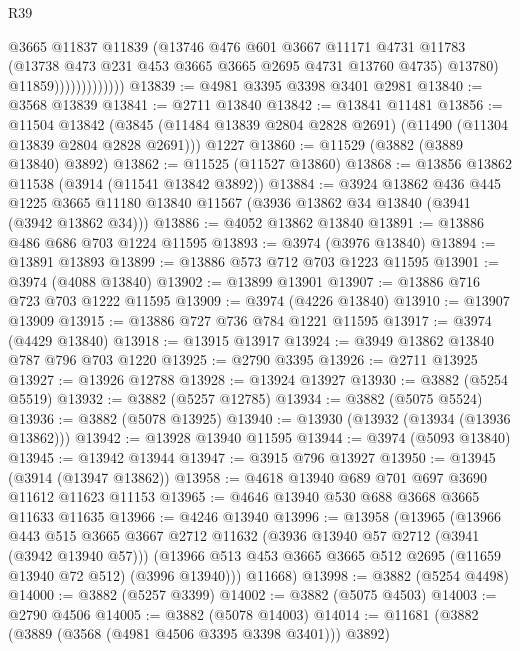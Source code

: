 \begin{lexlean}{R39}
\begin{coremodule}
                              @3665
                              @11837
                              @11839
                              (@13746
                                @476
                                @601
                                @3667
                                @11171
                                @4731
                                @11783
                                (@13738 @473 @231 @453 @3665 @3665 @2695 @4731 @13760 @4735)
                                @13780)
                              @11859)))))))))))))
@13839 := @4981 @3395 @3398 @3401 @2981
@13840 := @3568 @13839
@13841 := @2711 @13840
@13842 := @13841 @11481
@13856 := @11504
    @13842
    (@3845 (@11484 @13839 @2804 @2828 @2691) (@11490 (@11304 @13839 @2804 @2828 @2691)))
    @1227
@13860 := @11529 (@3882 (@3889 @13840) @3892)
@13862 := @11525 (@11527 @13860)
@13868 := @13856 @13862 @11538 (@3914 (@11541 @13842 @3892))
@13884 := @3924
    @13862
    @436
    @445
    @1225
    @3665
    @11180
    @13840
    @11567
    (@3936 @13862 @34 @13840 (@3941 (@3942 @13862 @34)))
@13886 := @4052 @13862 @13840
@13891 := @13886 @486 @686 @703 @1224 @11595
@13893 := @3974 (@3976 @13840)
@13894 := @13891 @13893
@13899 := @13886 @573 @712 @703 @1223 @11595
@13901 := @3974 (@4088 @13840)
@13902 := @13899 @13901
@13907 := @13886 @716 @723 @703 @1222 @11595
@13909 := @3974 (@4226 @13840)
@13910 := @13907 @13909
@13915 := @13886 @727 @736 @784 @1221 @11595
@13917 := @3974 (@4429 @13840)
@13918 := @13915 @13917
@13924 := @3949 @13862 @13840 @787 @796 @703 @1220
@13925 := @2790 @3395
@13926 := @2711 @13925
@13927 := @13926 @12788
@13928 := @13924 @13927
@13930 := @3882 (@5254 @5519)
@13932 := @3882 (@5257 @12785)
@13934 := @3882 (@5075 @5524)
@13936 := @3882 (@5078 @13925)
@13940 := @13930 (@13932 (@13934 (@13936 @13862)))
@13942 := @13928 @13940 @11595
@13944 := @3974 (@5093 @13840)
@13945 := @13942 @13944
@13947 := @3915 @796 @13927
@13950 := @13945 (@3914 (@13947 @13862))
@13958 := @4618 @13940 @689 @701 @697 @3690 @11612 @11623 @11153
@13965 := @4646 @13940 @530 @688 @3668 @3665 @11633 @11635
@13966 := @4246 @13940
@13996 := @13958
    (@13965
      (@13966
        @443
        @515
        @3665
        @3667
        @2712
        @11632
        (@3936 @13940 @57 @2712 (@3941 (@3942 @13940 @57)))
        (@13966 @513 @453 @3665 @3665 @512 @2695 (@11659 @13940 @72 @512) (@3996 @13940)))
      @11668)
@13998 := @3882 (@5254 @4498)
@14000 := @3882 (@5257 @3399)
@14002 := @3882 (@5075 @4503)
@14003 := @2790 @4506
@14005 := @3882 (@5078 @14003)
@14014 := @11681 (@3882 (@3889 (@3568 (@4981 @4506 @3395 @3398 @3401))) @3892)

\end{coremodule}
\end{lexlean}
